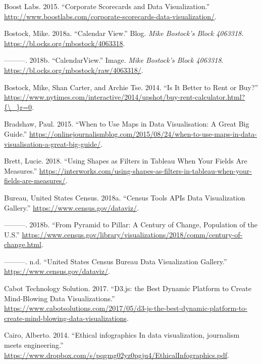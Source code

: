 \documentclass[]{book}
\begin{document}
\hypertarget{ref-SCORECARDS}{}
Boost Labs. 2015. ``Corporate Scorecards and Data Visualization.''
\url{http://www.boostlabs.com/corporate-scorecards-data-visualization/}.

\hypertarget{ref-Calendar_Layout}{}
Bostock, Mike. 2018a. ``Calendar View.'' Blog. \emph{Mike Bostock's
Block 4063318}. \url{https://bl.ocks.org/mbostock/4063318}.

\hypertarget{ref-CalendarView}{}
---------. 2018b. ``CalendarView.'' Image. \emph{Mike Bostock's Block
4063318}. \url{https://bl.ocks.org/mbostock/raw/4063318/}.

\hypertarget{ref-rent_or_buy}{}
Bostock, Mike, Shan Carter, and Archie Tse. 2014. ``Is It Better to Rent
or Buy?''
\href{https://www.nytimes.com/interactive/2014/upshot/buy-rent-calculator.html?\%7B/_\%7Dr=0}{https://www.nytimes.com/interactive/2014/upshot/buy-rent-calculator.html?\{\textbackslash{}\_\}r=0}.

\hypertarget{ref-Bradshaw}{}
Bradshaw, Paul. 2015. ``When to Use Maps in Data Visualisation: A Great
Big Guide.''
\url{https://onlinejournalismblog.com/2015/08/24/when-to-use-maps-in-data-visualisation-a-great-big-guide/}.

\hypertarget{ref-measures}{}
Brett, Lucie. 2018. ``Using Shapes as Filters in Tableau When Your
Fields Are Measures.''
\url{https://interworks.com/using-shapes-as-filters-in-tableau-when-your-fields-are-measures/}.

\hypertarget{ref-CensusDataViz}{}
Bureau, United States Census. 2018a. ``Census Tools APIs Data
Visualization Gallery.'' \url{https://www.census.gov/dataviz/}.

\hypertarget{ref-population_pyramid}{}
---------. 2018b. ``From Pyramid to Pillar: A Century of Change,
Population of the U.S.''
\url{https://www.census.gov/library/visualizations/2018/comm/century-of-change.html}.

\hypertarget{ref-census_viz}{}
---------. n.d. ``United States Census Bureau Data Visualization
Gallery.'' \url{https://www.census.gov/dataviz/}.

\hypertarget{ref-d3_interactive_viz}{}
Cabot Technology Solution. 2017. ``D3.js: the Best Dynamic Platform to
Create Mind-Blowing Data Visualizations.''
\url{https://www.cabotsolutions.com/2017/05/d3-js-the-best-dynamic-platform-to-create-mind-blowing-data-visualizations}.

\hypertarget{ref-ethical_infographics}{}
Cairo, Alberto. 2014. ``Ethical infographics In data visualization,
journalism meets engineering.''
\url{https://www.dropbox.com/s/pqgmg02yz0pgju4/EthicalInfographics.pdf}.
\end{document}
